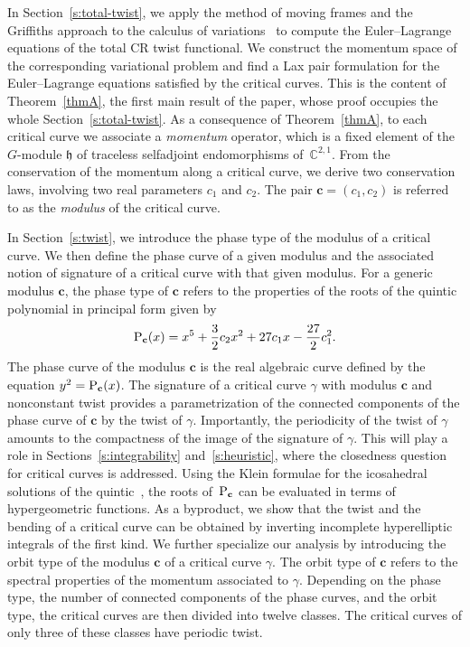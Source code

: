 \documentclass[pdftex]{sigma}
\numberwithin{equation}{section}
\begin{document}
In Section~\ref{s:total-twist},
we apply the method of moving frames
and the Griffiths approach to the calculus of variations~\cite{Gr,Hsu, GM} to compute the Euler--Lagrange equations
of the total CR twist functional.
We construct the momentum space of the corresponding variational problem
%
and find a Lax pair formulation for the Euler--Lagrange equations satisfied by the critical curves.
This is the content of Theorem~\ref{thmA}, the first main result of the paper, whose proof occupies
the whole Section~\ref{s:total-twist}.
As a consequence of Theorem~\ref{thmA},
%
to each critical curve we associate a \textit{momentum} operator, which is
a fixed element of the $G$-module $\mathfrak{h}$
of traceless selfadjoint endomorphisms of~$\mathbb{C}^{2,1}$.
From the conservation of the momentum along a critical curve,
we derive two conservation laws, involving two
real parameters $c_1$ and $c_2$.
The pair $\mathbf{c}=(c_1,c_2)$ is referred to as the \textit{modulus} of the critical curve.

In Section~\ref{s:twist},
we introduce the phase type of the modulus of a critical curve. We then define the phase curve
of a
given modulus and the associated notion of signature of a critical curve with that given modulus.
For a generic modulus $\mathbf{c}$, the phase type of $\mathbf{c}$ refers to the properties of the roots
of the quintic polynomial in principal form given by
\[{\rm P}_{\mathbf{c}}(x)=x^5+\frac{3}{2}c_2x^2+27c_1x-\frac{27}{2}c_1^2 .\]
The phase curve of
the modulus $\mathbf{c}$ is the real algebraic curve
defined by the equation ${y^2={\rm P}_{\mathbf{c}}(x)}$.
The signature of a critical curve $\gamma$ with modulus $\mathbf{c}$ and nonconstant twist
provides a parametrization of the connected components of the
phase curve of $\mathbf{c}$ by the twist of $\gamma$. Importantly, the periodicity of the twist of $\gamma$
amounts to the compactness of the image of the signature of $\gamma$.
This will play a role in Sections~\ref{s:integrability}
and~\ref{s:heuristic}, where the closedness question for critical curves is addressed.
Using the Klein formulae for the icosahedral solutions of the quintic~\cite{K,Na,Tr},
the roots of~${\rm P}_{\mathbf{c}}$
can be evaluated in terms of hypergeometric functions. As a byproduct, we show that the twist
and the bending of a
critical curve can be obtained by inverting incomplete hyperelliptic integrals of the first kind.
We further specialize our analysis by introducing the orbit type of the modulus $\mathbf{c}$ of a
critical curve $\gamma$. The orbit type of $\mathbf{c}$ refers to the spectral properties of the momentum associated to $\gamma$.
Depending on the phase type, the number of connected components of the phase curves,
and the orbit type, the critical curves are then divided into twelve classes.
The critical curves of only three of these classes have periodic twist.
\end{document}

